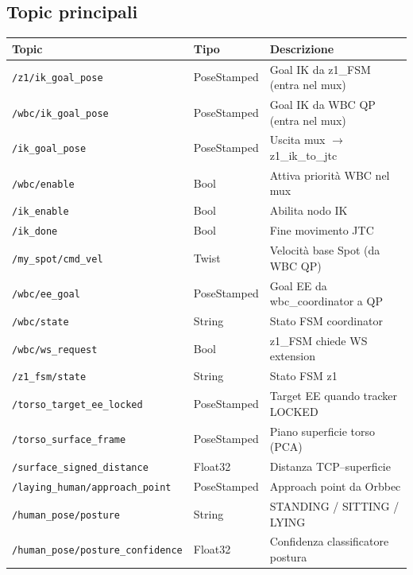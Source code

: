 \documentclass[a4paper,11pt]{article}
\begin{document}
\subsection*{Topic principali}
\begin{center}
\begin{tabular}{lll}
\toprule
\textbf{Topic} & \textbf{Tipo} & \textbf{Descrizione} \\
\midrule
\texttt{/z1/ik\_goal\_pose}             & PoseStamped & Goal IK da z1\_FSM (entra nel mux) \\
\texttt{/wbc/ik\_goal\_pose}            & PoseStamped & Goal IK da WBC QP (entra nel mux) \\
\texttt{/ik\_goal\_pose}                & PoseStamped & Uscita mux $\to$ z1\_ik\_to\_jtc \\
\texttt{/wbc/enable}                    & Bool        & Attiva priorità WBC nel mux \\
\texttt{/ik\_enable}                    & Bool        & Abilita nodo IK \\
\texttt{/ik\_done}                      & Bool        & Fine movimento JTC \\
\texttt{/my\_spot/cmd\_vel}             & Twist       & Velocità base Spot (da WBC QP) \\
\texttt{/wbc/ee\_goal}                  & PoseStamped & Goal EE da wbc\_coordinator a QP \\
\texttt{/wbc/state}                     & String      & Stato FSM coordinator \\
\texttt{/wbc/ws\_request}               & Bool        & z1\_FSM chiede WS extension \\
\texttt{/z1\_fsm/state}                 & String      & Stato FSM z1 \\
\texttt{/torso\_target\_ee\_locked}     & PoseStamped & Target EE quando tracker LOCKED \\
\texttt{/torso\_surface\_frame}         & PoseStamped & Piano superficie torso (PCA) \\
\texttt{/surface\_signed\_distance}     & Float32     & Distanza TCP--superficie \\
\texttt{/laying\_human/approach\_point} & PoseStamped & Approach point da Orbbec \\
\texttt{/human\_pose/posture}           & String      & STANDING / SITTING / LYING \\
\texttt{/human\_pose/posture\_confidence} & Float32  & Confidenza classificatore postura \\
\bottomrule
\end{tabular}
\end{center}
\end{document}
